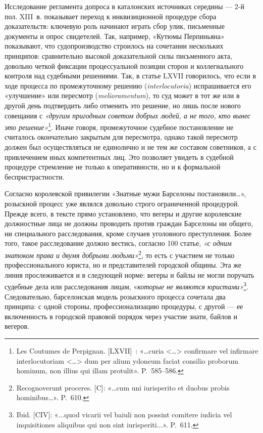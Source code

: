 Исследование регламента допроса в каталонских источниках середины --- 2-й пол. XIII~в. показывает переход к инквизиционной процедуре сбора доказательств: ключевую роль начинают играть сбор улик, письменные документы и опрос свидетелей. Так, например, «Кутюмы Перпиньяна» показывают, что судопроизводство строилось на сочетании нескольких принципов: сравнительно высокой доказательной силы письменного акта, довольно четкой фиксации процессуальной позиции сторон и коллегиального контроля над судебными решениями. Так, в статье LXVII говорилось, что если в ходе процесса по промежуточному решению (\emph{interlocutoria}) испрашивается его «улучшение» или пересмотр (\emph{melioramentum}), то суд может в тот же или в другой день подтвердить либо отменить это решение, но лишь после нового совещания с \emph{«другим пригодным советом добрых людей, а не того, кто вынес это решение»}\footnote{Les Coutumes de Perpignan. [LXVII]~: «…curia <…> confirmare vel infirmare interlocutoriam <…> dum per alium ydoneum faciat consilio proborum hominum, non illius qui illam protulit». P.~585--586.}. Иначе говоря, промежуточное судебное постановление не считалось окончательно закрытым для пересмотра, однако такой пересмотр должен был осуществляться не единолично и не тем же составом советников, а с привлечением иных компетентных лиц. Это позволяет увидеть в судебной процедуре стремление не только к оперативности, но и к формальной беспристрастности.

Согласно королевской привилегии «Знатные мужи Барселоны постановили…», розыскной процесс уже являлся довольно строго ограниченной процедурой. Прежде всего, в тексте прямо установлено, что вегеры и другие королевские должностные лица не должны проводить против граждан Барселоны ни общего, ни специального расследования, кроме случаев уголовного преступления. Более того, такое расследование должно вестись, согласно 100 статье, \emph{«с одним знатоком права и двумя добрыми людьми»}\footnote{Recognoverunt proceres. [C]: «…cum uni iurisperito et duobus probis hominibus…». P.~610.}, то есть с участием не только профессионального юриста, но и представителей городской общины. Эта же линия прослеживается и в следующей норме: вегеры и байлы не могли поручать судебные дела или расследования лицам, «\emph{которые не являются юристами»}\footnote{Ibid. [CIV]: «...quod vicarii vel baiuli non possint comitere iudicia vel inquisitiones aliquibus qui non sint iurisperiti...». P.~611.}. Следовательно, барселонская модель розыскного процесса сочетала два принципа: с одной стороны, профессионализацию процедуры, с другой --- ее включенность в городской правовой порядок через участие знати, байлов и вегеров.


